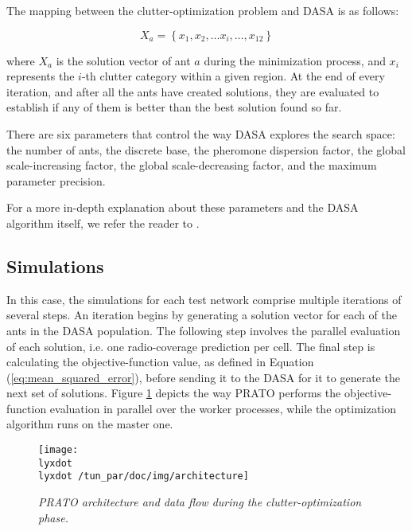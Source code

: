 The mapping between the clutter-optimization problem and DASA is as
follows:

\begin{equation}
X_{a}=\left\{ x_{1},x_{2},\ldots x_{i},\ldots,x_{12}\right\} \label{eq:DASA-problem_mapping}
\end{equation}


\noindent where $X_{a}$ is the solution vector of ant $a$ during
the minimization process, and $x_{i}$ represents the $i$-th clutter
category within a given region. At the end of every iteration, and
after all the ants have created solutions, they are evaluated to establish
if any of them is better than the best solution found so far.

There are six parameters that control the way DASA explores the search
space: the number of ants, the discrete base, the pheromone dispersion
factor, the global scale-increasing factor, the global scale-decreasing
factor, and the maximum parameter precision.

For a more in-depth explanation about these parameters and the DASA
algorithm itself, we refer the reader to \cite{Korosec-The_differential_ant_stigmergy_algorithm:2012}.


\subsection{Simulations}

In this case, the simulations for each test network comprise multiple
iterations of several steps. An iteration begins by generating a solution
vector for each of the ants in the DASA population. The following
step involves the parallel evaluation of each solution, i.e. one radio-coverage
prediction per cell. The final step is calculating the objective-function
value, as defined in Equation (\ref{eq:mean_squared_error}), before
sending it to the DASA for it to generate the next set of solutions.
Figure \ref{fig:PRATO_architecture_optimization} depicts the way
PRATO performs the objective-function evaluation in parallel over
the worker processes, while the optimization algorithm runs on the
master one.

\begin{figure}
\centering

\texttt{[image: \\lyxdot \\lyxdot /tun\_par/doc/img/architecture]}

\caption{\textit{PRATO architecture and data flow during the clutter-optimization
phase.\label{fig:PRATO_architecture_optimization}}}
\end{figure}


